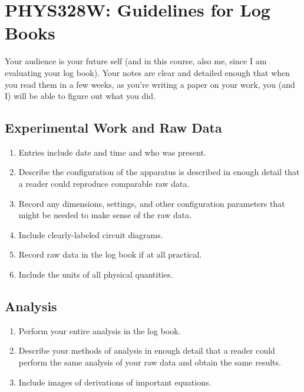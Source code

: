 \documentclass[11 pt]{article}
\begin{document}
\section*{PHYS328W: Guidelines for Log Books}

Your audience is your future self (and in this course, also me, since
I am evaluating your log book). Your notes are clear and detailed
enough that when you read them in a few weeks, as you're writing a
paper on your work, you (and I) will be able to figure out what you
did.

\subsection*{Experimental Work and Raw Data}
\begin{enumerate}
\item Entries include date and time and who was present.

\item Describe the configuration of the apparatus is described in enough 
  detail that a reader could reproduce comparable raw data.

\item Record any dimensions, settings, and other configuration
  parameters that might be needed to make sense of the raw data.

\item Include clearly-labeled circuit diagrams.

\item Record raw data in the log book if at all practical.

\item Include the units of all physical quantities.
\end{enumerate}

\subsection*{Analysis}
\begin{enumerate}
\item Perform your entire analysis in the log book.
  
\item Describe your methods of analysis in enough detail that a reader
  could perform the same analysis of your raw data and obtain the same
  results.

\item Include images of derivations of important equations.
\end{enumerate}
\end{document}
